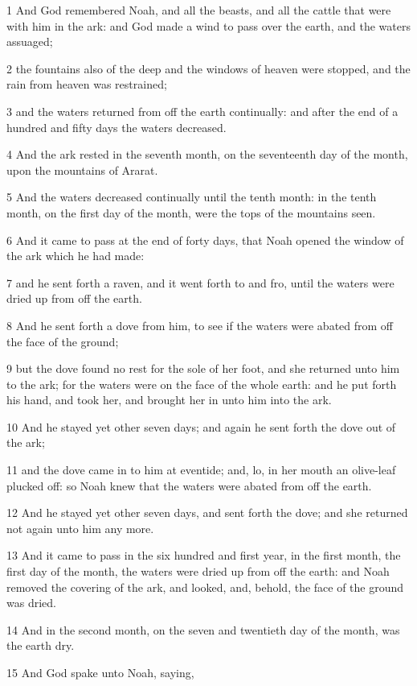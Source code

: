 \par 1 And God remembered Noah, and all the beasts, and all the cattle that were with him in the ark: and God made a wind to pass over the earth, and the waters assuaged;
\par 2 the fountains also of the deep and the windows of heaven were stopped, and the rain from heaven was restrained;
\par 3 and the waters returned from off the earth continually: and after the end of a hundred and fifty days the waters decreased.
\par 4 And the ark rested in the seventh month, on the seventeenth day of the month, upon the mountains of Ararat.
\par 5 And the waters decreased continually until the tenth month: in the tenth month, on the first day of the month, were the tops of the mountains seen.
\par 6 And it came to pass at the end of forty days, that Noah opened the window of the ark which he had made:
\par 7 and he sent forth a raven, and it went forth to and fro, until the waters were dried up from off the earth.
\par 8 And he sent forth a dove from him, to see if the waters were abated from off the face of the ground;
\par 9 but the dove found no rest for the sole of her foot, and she returned unto him to the ark; for the waters were on the face of the whole earth: and he put forth his hand, and took her, and brought her in unto him into the ark.
\par 10 And he stayed yet other seven days; and again he sent forth the dove out of the ark;
\par 11 and the dove came in to him at eventide; and, lo, in her mouth an olive-leaf plucked off: so Noah knew that the waters were abated from off the earth.
\par 12 And he stayed yet other seven days, and sent forth the dove; and she returned not again unto him any more.
\par 13 And it came to pass in the six hundred and first year, in the first month, the first day of the month, the waters were dried up from off the earth: and Noah removed the covering of the ark, and looked, and, behold, the face of the ground was dried.
\par 14 And in the second month, on the seven and twentieth day of the month, was the earth dry.
\par 15 And God spake unto Noah, saying,
